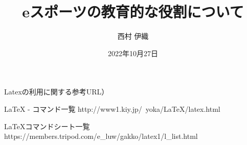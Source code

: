 \documentclass[chukan]{hitsotsuron} %
\title{eスポーツの教育的な役割について\\}
\author{西村 伊織}
\date{2022年10月27日}
\begin{document}

\twocolumn[%
\maketitle
]


Latexの利用に関する参考URL）

LaTeX - コマンド一覧
http://www1.kiy.jp/~yoka/LaTeX/latex.html

LaTeXコマンドシート一覧
https://members.tripod.com/e_luw/gakko/latex1/l_list.html

\fi







%



\end{document}
